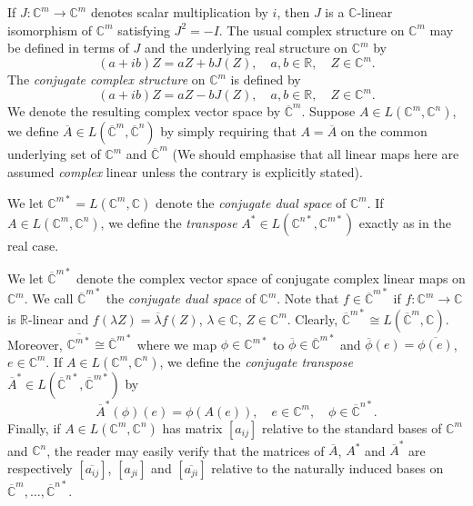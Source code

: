 If $J:\mathbb C^m\to\mathbb C^m$ denotes scalar multiplication by $i$, then $J$ is a $\mathbb C$-linear isomorphism of $\mathbb C^m$ satisfying $J^2=-I$. The usual complex structure on $\mathbb C^m$ may be defined in terms of $J$ and the underlying real structure on $\mathbb C^m$ by
\[ (a+ib)Z=aZ+bJ(Z),\quad a,b\in\mathbb R,\quad Z\in\mathbb C^m. \]
The \emph{conjugate complex structure} on $\mathbb C^m$ is defined by
\[ (a+ib)Z=aZ-bJ(Z),\quad a,b\in\mathbb R,\quad Z\in\mathbb C^m. \]
We denote the resulting complex vector space by $\overline{\mathbb C}^{m}$. Suppose $A\in L(\mathbb C^m,\mathbb C^n)$, we define $\overline A\in L(\overline{\mathbb C}^{m},\overline{\mathbb C}^{n})$ by simply requiring that $A=\overline A$ on the common underlying set of $\mathbb C^m$ and $\overline{\mathbb C}^{m}$ (We should emphasise that all linear maps here are assumed \emph{complex} linear unless the contrary is explicitly stated).

We let $\mathbb C^{m*}=L(\mathbb C^m,\mathbb C)$ denote the \emph{conjugate dual space} of $\mathbb C^m$. If $A\in L(\mathbb C^m,\mathbb C^n)$, we define the \emph{transpose} $A^*\in L(\mathbb C^{n*},\mathbb C^{m*})$ exactly as in the real case.

We let $\overline{\mathbb C}^{m*}$ denote the complex vector space of conjugate complex linear maps on $\mathbb C^m$. We call $\overline{\mathbb C}^{m*}$ the \emph{conjugate dual space} of $\mathbb C^m$. Note that $f\in\overline{\mathbb C}^{m*}$ if $f:\mathbb C^m\to\mathbb C$ is $\mathbb R$-linear and $f(\lambda Z)=\overline\lambda f(Z)$, $\lambda\in\mathbb C$, $Z\in\mathbb C^m$. Clearly, $\overline{\mathbb C}^{m*}\cong L(\overline{\mathbb C}^{m},\mathbb C)$. Moreover, $\overline{\mathbb C^{m*}}\cong\overline{\mathbb C}^{m*}$ where we map $\phi\in\mathbb C^{m*}$ to $\overline\phi\in\overline{\mathbb C}^{m*}$ and $\overline\phi(e)=\overline{\phi(e)}$, $e\in\mathbb C^m$. If $A\in L(\mathbb C^m,\mathbb C^n)$, we define the \emph{conjugate transpose} $\overline A^*\in L(\overline{\mathbb C}^{n*},\overline{\mathbb C}^{m*})$ by
\[ \overline A^*(\phi)(e)=\phi(A(e)),\quad e\in\mathbb C^m,\quad\phi\in\overline{\mathbb C}^{n*}. \]
Finally, if $A\in L(\mathbb C^m,\mathbb C^n)$ has matrix $[a_{ij}]$ relative to the standard bases of $\mathbb C^m$ and $\mathbb C^n$, the reader may easily verify that the matrices of $\overline A$, $A^*$ and $\overline A^*$ are respectively $[\overline{a_{ij}}]$, $[a_{ji}]$ and $[\overline{a_{ji}}]$ relative to the naturally induced bases on $\overline{\mathbb C}^m,\ldots,\overline{\mathbb C}^{n*}$.
